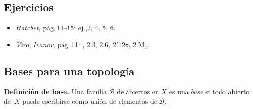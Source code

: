 \subsection{Ejercicios}
\begin{itemize}
  \item \textit{Hatchet}, pág.\,14--15: \;ej.,2, 4, 5, 6.
  \item \textit{Viro, Ivanov}, pág.\,11: , 2.3, 2.6, 2$'$12x, 2.M$_x$.
\end{itemize}

\subsection{Bases para una topología}

\textbf{Definición de base.}
Una familia $\mathcal{B}$ de abiertos en $X$ es una \emph{base} si todo abierto de~$X$ puede escribirse como unión de elementos de $\mathcal{B}$.

